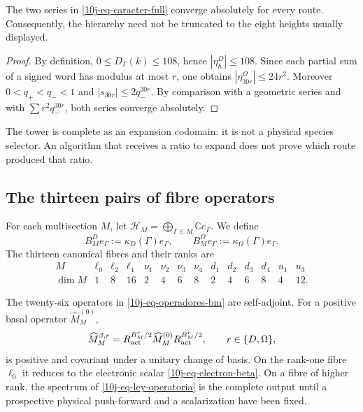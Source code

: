 \begin{proposition}
\label{10j-prop-convergencia-torres}
The two series in \eqref{10j-eq-caracter-full} converge absolutely for every route. Consequently, the hierarchy need not be truncated to the eight heights usually displayed.
\end{proposition}

\begin{proof}
By definition, \(0\le D_\Gamma(k)\le108\), hence \(|\eta_h^D|\le108\). Since each partial sum of a signed word has modulus at most \(r\), one obtains \(|\eta_{30r}^\Omega|\le24r^2\). Moreover \(0<q_+<q_-<1\) and \(|s_{30r}|\le2q_-^{30r}\). By comparison with a geometric series and with \(\sum r^2q_-^{30r}\), both series converge absolutely.
\end{proof}

The tower is complete as an expansion codomain: it is not a physical species selector. An algorithm that receives a ratio to expand does not prove which route produced that ratio.

\subsection{The thirteen pairs of fibre operators}

For each multisection \(M\), let \(
 \mathcal H_M=\bigoplus_{\Gamma\in M}\mathbb C e_\Gamma
\). We define
\begin{equation}
 B_M^D e_\Gamma:=\kappa_D(\Gamma)e_\Gamma,
 \qquad
 B_M^\Omega e_\Gamma:=\kappa_\Omega(\Gamma)e_\Gamma.
 \label{10j-eq-operadores-bm}
\end{equation}
The thirteen canonical fibres and their ranks are
\begin{equation}
 \begin{array}{c|ccccccccccccc}
 M&\ell_0&\ell_2&\ell_4&\nu_1&\nu_2&\nu_3&\nu_4
  &d_1&d_2&d_3&d_4&u_1&u_3\\ \hline
 \dim M&1&8&16&2&4&6&8&2&4&6&8&4&12.
 \end{array}
 \label{10j-eq-trece-fibras}
\end{equation}

\begin{theorem}
\label{10j-thm-ley-operatoria}
The twenty-six operators in \eqref{10j-eq-operadores-bm} are self-adjoint. For a positive basal operator \(\widehat M_M^{(0)}\),
\begin{equation}
 \widehat M_M^{\beta,r}
 =R_{\rm act}^{B_M^r/2}
  \widehat M_M^{(0)}
  R_{\rm act}^{B_M^r/2},
 \qquad r\in\{D,\Omega\},
 \label{10j-eq-ley-operatoria}
\end{equation}
is positive and covariant under a unitary change of basis. On the rank-one fibre \(\ell_0\) it reduces to the electronic scalar \eqref{10j-eq-electron-beta}. On a fibre of higher rank, the spectrum of \eqref{10j-eq-ley-operatoria} is the complete output until a prospective physical push-forward and a scalarization have been fixed.
\end{theorem}

